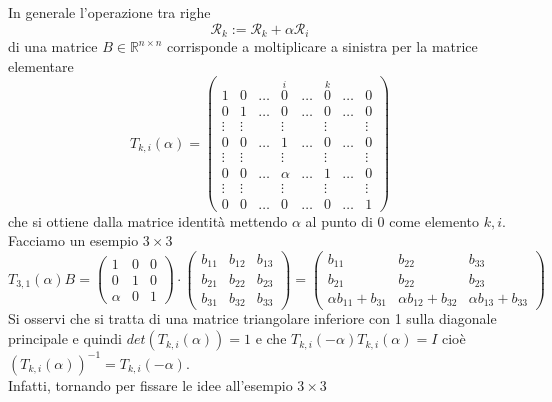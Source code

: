 \documentclass[12pt,a4paper]{article}
\begin{document}
In generale l'operazione tra righe
\begin{equation*}
    \mathcal{R}_k:=\mathcal{R}_k+\alpha\mathcal{R}_i
\end{equation*}
di una matrice $B\in\mathbb{R}^{n\times n}$ corrisponde a moltiplicare a sinistra per la matrice elementare
\begin{equation*}
    T_{k,i}(\alpha)=\begin{pmatrix}
        1 & 0 & \dots & \overset{i}{0} & \dots & \overset{k}{0} & \dots & 0 \\
        0 & 1 & \dots & 0 & \dots & 0 & \dots & 0 \\
        \vdots & \vdots &  & \vdots &  & \vdots &  & \vdots \\
        0 & 0 & \dots & 1 & \dots & 0 & \dots & 0 \\
        \vdots & \vdots &  & \vdots &  & \vdots &  & \vdots \\
        0 & 0 & \dots & \alpha & \dots & 1 & \dots & 0 \\
        \vdots & \vdots &  & \vdots &  & \vdots &  & \vdots \\
        0 & 0 & \dots & 0 & \dots & 0 & \dots & 1
    \end{pmatrix}
\end{equation*}
che si ottiene dalla matrice identità mettendo $\alpha$ al punto di 0 come elemento $k,i$.\\Facciamo un esempio $3\times 3$
\begin{equation*}
    T_{3,1}(\alpha)B=
    \begin{pmatrix}
        1 & 0 & 0 \\
        0 & 1 & 0 \\
        \alpha & 0 & 1
    \end{pmatrix} \cdot \begin{pmatrix}
        b_{11} & b_{12} & b_{13} \\
        b_{21} & b_{22} & b_{23} \\
        b_{31} & b_{32} & b_{33}
    \end{pmatrix}=\begin{pmatrix}
        b_{11} & b_{22} & b_{33} \\
        b_{21} & b_{22} & b_{23} \\
        \alpha b_{11}+b_{31} & \alpha b_{12}+b_{32} & \alpha b_{13}+b_{33}
    \end{pmatrix}
\end{equation*}
Si osservi che si tratta di una matrice triangolare inferiore con 1 sulla diagonale principale e quindi $det(T_{k,i}(\alpha))=1$ e che $T_{k,i}(-\alpha)T_{k,i}(\alpha)= I$ cioè $(T_{k,i}(\alpha))^{-1}=T_{k,i}(-\alpha)$.\\Infatti, tornando per fissare le idee all'esempio $3\times 3$
\end{document}
